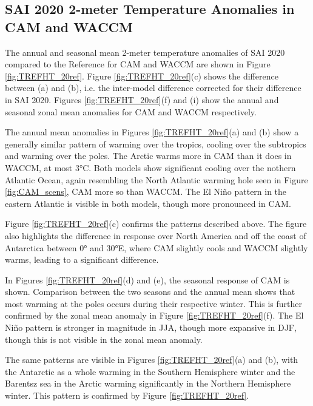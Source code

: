 \subsection{SAI 2020 2-meter Temperature Anomalies in CAM and WACCM}
The annual and seasonal mean 2-meter temperature anomalies of SAI 2020 compared to the Reference for CAM and WACCM are shown in Figure \ref{fig:TREFHT_20ref}. Figure \ref{fig:TREFHT_20ref}(c) shows the difference between (a) and (b), i.e. the inter-model difference corrected for their difference in SAI 2020. Figures \ref{fig:TREFHT_20ref}(f) and (i) show the annual and seasonal zonal mean anomalies for CAM and WACCM respectively. 

The annual mean anomalies in Figures \ref{fig:TREFHT_20ref}(a) and (b) show a generally similar pattern of warming over the tropics, cooling over the subtropics and warming over the poles. The Arctic warms more in CAM than it does in WACCM, at most 3°C. Both models show significant cooling over the nothern Atlantic Ocean, again resembling the North Atlantic warming hole seen in Figure \ref{fig:CAM_scens}, CAM more so than WACCM. The El Ni\~no pattern in the eastern Atlantic is visible in both models, though more pronounced in CAM. 

Figure \ref{fig:TREFHT_20ref}(c) confirms the patterns described above. The figure also highlights the difference in response over North America and off the coast of Antarctica between 0° and 30°E, where CAM slightly cools and WACCM slightly warms, leading to a significant difference.

In Figures \ref{fig:TREFHT_20ref}(d) and (e), the seasonal response of CAM is shown. Comparison between the two seasons and the annual mean shows that most warming at the poles occurs during their respective winter. This is further confirmed by the zonal mean anomaly in Figure \ref{fig:TREFHT_20ref}(f). The El Ni\~no pattern is stronger in magnitude in JJA, though more expansive in DJF, though this is not visible in the zonal mean anomaly. 

The same patterns are visible in Figures \ref{fig:TREFHT_20ref}(a) and (b), with the Antarctic as a whole warming in the Southern Hemisphere winter and the Barentsz sea in the Arctic warming significantly in the Northern Hemisphere winter. This pattern is confirmed by Figure \ref{fig:TREFHT_20ref}. 

